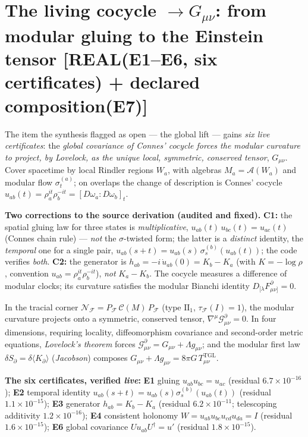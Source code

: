 \documentclass[11pt]{article}
\theoremstyle{definition}\newtheorem{deriv}{Derivation}
\begin{document}
\section*{The living cocycle $\longrightarrow G_{\mu\nu}$: from modular gluing to the Einstein tensor \textsf{[REAL(E1--E6, six certificates) + declared composition(E7)]}}

The item the synthesis flagged as open --- the global lift --- gains \emph{six live certificates}: the \emph{global covariance of Connes' cocycle forces the modular curvature to project, by Lovelock, as the unique local, symmetric, conserved tensor}, $G_{\mu\nu}$. Cover spacetime by local Rindler regions $W_a$, with algebras $M_a=\mathcal A(W_a)$ and modular flow $\sigma_t^{(a)}$; on overlaps the change of description is Connes' cocycle $u_{ab}(t)=\rho_a^{it}\rho_b^{-it}=[D\omega_a:D\omega_b]_t$.

\textbf{Two corrections to the source derivation (audited and fixed).} \textbf{C1:} the spatial gluing law for three states is \emph{multiplicative}, $u_{ab}(t)\,u_{bc}(t)=u_{ac}(t)$ (Connes chain rule) --- \emph{not} the $\sigma$-twisted form; the latter is a \emph{distinct} identity, the \emph{temporal} one for a single pair, $u_{ab}(s{+}t)=u_{ab}(s)\,\sigma_s^{(b)}(u_{ab}(t))$; the code verifies \emph{both}. \textbf{C2:} the generator is $h_{ab}=-i\,\dot u_{ab}(0)=K_b-K_a$ (with $K=-\log\rho$, convention $u_{ab}=\rho_a^{it}\rho_b^{-it}$), \emph{not} $K_a-K_b$. The cocycle measures a difference of modular clocks; its curvature satisfies the modular Bianchi identity $D_{[\lambda}F^\partial_{\mu\nu]}=0$.

In the tracial corner $\mathcal N_{\mathcal F}=P_{\mathcal F}\,\mathcal C(M)\,P_{\mathcal F}$ (type $\mathrm{II}_1$, $\tau_{\mathcal F}(I)=1$), the modular curvature projects onto a symmetric, conserved tensor, $\nabla^\mu\mathcal G^\partial_{\mu\nu}=0$. In four dimensions, requiring locality, diffeomorphism covariance and second-order metric equations, \emph{Lovelock's theorem} forces $\mathcal G^\partial_{\mu\nu}=G_{\mu\nu}+\Lambda g_{\mu\nu}$; and the modular first law $\delta S_\partial=\delta\langle K_\partial\rangle$ (\emph{Jacobson}) composes $G_{\mu\nu}+\Lambda g_{\mu\nu}=8\pi G\,T^{\mathrm{TGL}}_{\mu\nu}$.

\textbf{The six certificates, verified \emph{live}:} \textbf{E1} gluing $u_{ab}u_{bc}=u_{ac}$ (residual $6.7\times10^{-16}$); \textbf{E2} temporal identity $u_{ab}(s{+}t)=u_{ab}(s)\sigma_s^{(b)}(u_{ab}(t))$ (residual $1.1\times10^{-15}$); \textbf{E3} generator $h_{ab}=K_b-K_a$ (residual $6.2\times10^{-11}$; telescoping additivity $1.2\times10^{-16}$); \textbf{E4} consistent holonomy $W=u_{ab}u_{bc}u_{cd}u_{da}=I$ (residual $1.6\times10^{-15}$); \textbf{E6} global covariance $U u_{ab}U^\dagger=u'$ (residual $1.8\times10^{-15}$).
\end{document}
